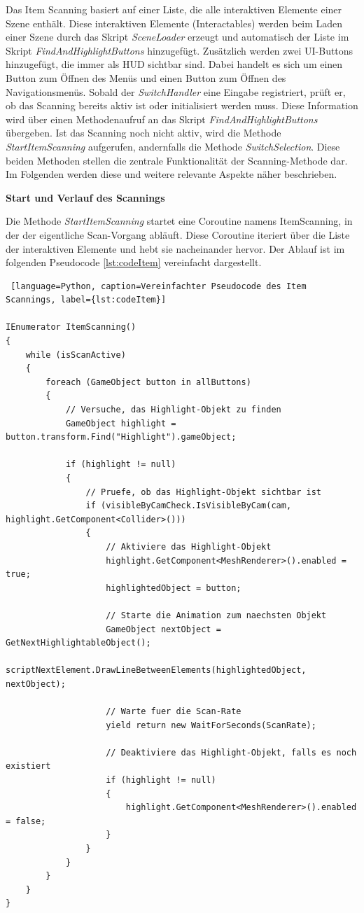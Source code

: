 Das Item Scanning basiert auf einer Liste, die alle interaktiven Elemente einer Szene enthält. Diese interaktiven Elemente (Interactables) werden beim Laden einer Szene durch das Skript \textit{SceneLoader} erzeugt und automatisch der Liste im Skript \textit{FindAndHighlightButtons} hinzugefügt. Zusätzlich werden zwei UI-Buttons hinzugefügt, die immer als HUD sichtbar sind. Dabei handelt es sich um einen Button zum Öffnen des Menüs und einen Button zum Öffnen des Navigationsmenüs. Sobald der \textit{SwitchHandler} eine Eingabe registriert, prüft er, ob das Scanning bereits aktiv ist oder initialisiert werden muss. Diese Information wird über einen Methodenaufruf an das Skript \textit{FindAndHighlightButtons} übergeben. Ist das Scanning noch nicht aktiv, wird die Methode \textit{StartItemScanning} aufgerufen, andernfalls die Methode \textit{SwitchSelection}. Diese beiden Methoden stellen die zentrale Funktionalität der Scanning-Methode dar. Im Folgenden werden diese und weitere relevante Aspekte näher beschrieben.

\textbf{Start und Verlauf des Scannings}

Die Methode \textit{StartItemScanning} startet eine Coroutine namens ItemScanning, in der der eigentliche Scan-Vorgang abläuft. Diese Coroutine iteriert über die Liste der interaktiven Elemente und hebt sie nacheinander hervor. Der Ablauf ist im folgenden Pseudocode \autoref{lst:codeItem} vereinfacht dargestellt.

\begin{lstlisting} [language=Python, caption=Vereinfachter Pseudocode des Item Scannings, label={lst:codeItem}]

IEnumerator ItemScanning()
{
    while (isScanActive)
    {
        foreach (GameObject button in allButtons)
        {
            // Versuche, das Highlight-Objekt zu finden
            GameObject highlight = button.transform.Find("Highlight").gameObject;
            
            if (highlight != null)
            {
                // Pruefe, ob das Highlight-Objekt sichtbar ist
                if (visibleByCamCheck.IsVisibleByCam(cam, highlight.GetComponent<Collider>()))
                {
                    // Aktiviere das Highlight-Objekt
                    highlight.GetComponent<MeshRenderer>().enabled = true;
                    highlightedObject = button;

                    // Starte die Animation zum naechsten Objekt
                    GameObject nextObject = GetNextHighlightableObject();
                    scriptNextElement.DrawLineBetweenElements(highlightedObject, nextObject);

                    // Warte fuer die Scan-Rate
                    yield return new WaitForSeconds(ScanRate);

                    // Deaktiviere das Highlight-Objekt, falls es noch existiert
                    if (highlight != null)
                    {
                        highlight.GetComponent<MeshRenderer>().enabled = false;
                    }
                }
            }
        }
    }
}

\end{lstlisting}

